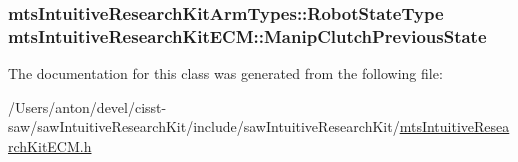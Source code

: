 \subsubsection[{Manip\+Clutch\+Previous\+State}]{\setlength{\rightskip}{0pt plus 5cm}mts\+Intuitive\+Research\+Kit\+Arm\+Types\+::\+Robot\+State\+Type mts\+Intuitive\+Research\+Kit\+E\+C\+M\+::\+Manip\+Clutch\+Previous\+State}\label{classmts_intuitive_research_kit_e_c_m_a8e17d129e26e3f66c71c4b128f1e8c44}


The documentation for this class was generated from the following file\+:\begin{DoxyCompactItemize}
\item 
/\+Users/anton/devel/cisst-\/saw/saw\+Intuitive\+Research\+Kit/include/saw\+Intuitive\+Research\+Kit/\hyperlink{mts_intuitive_research_kit_e_c_m_8h}{mts\+Intuitive\+Research\+Kit\+E\+C\+M.\+h}\end{DoxyCompactItemize}
